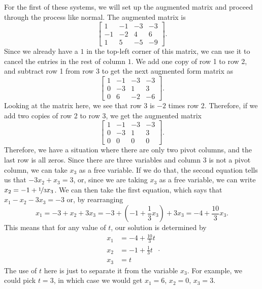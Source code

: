 \begin{exampleSol}
For the first of these systems, we will set up the augmented matrix and proceed through the process like normal. The augmented matrix is
\begin{equation*}
\left[ 
\begin{array}{ccc|c}
1 & -1 & -3 & -3 \\
-1 & -2 & 4 & 6 \\
1 & 5 & -5 & -9
\end{array}
\right].
\end{equation*}
Since we already have a $1$ in the top-left corner of this matrix, we can use it to cancel the entries in the rest of column $1$.  We add one copy of row 1 to row 2, and subtract row 1 from row 3 to get the next augmented form matrix as
\begin{equation*}
\left[ 
\begin{array}{ccc|c}
1 & -1 & -3 & -3 \\
0 & -3 & 1 & 3 \\
0 & 6 & -2 & -6
\end{array}
\right].
\end{equation*}
Looking at the matrix here, we see that row 3 is $-2$ times row 2. Therefore, if we add two copies of row 2 to row 3, we get the augmented matrix
\begin{equation*}
\left[ 
\begin{array}{ccc|c}
1 & -1 & -3 & -3 \\
0 & -3 & 1 & 3 \\
0 & 0 & 0 & 0
\end{array}
\right].
\end{equation*}
Therefore, we have a situation where there are only two pivot columns, and the last row is all zeros. Since there are three variables and column 3 is not a pivot column, we can take $x_3$ as a free variable. If we do that, the second equation tells us that $-3x_2 + x_3 = 3$, or, since we are taking $x_3$ as a free variable, we can write $x_2 = -1 + \nicefrac{1}{3}x_3$. We can then take the first equation, which says that $x_1 - x_2 - 3x_3 = -3$ or, by rearranging
\begin{equation*}
x_1 = -3 + x_2 + 3x_3 = -3 + \left(-1 + \frac{1}{3}x_3\right) + 3x_3 = -4 + \frac{10}{3}x_3.
\end{equation*}
This means that for any value of $t$, our solution is determined by
\begin{equation*}
\begin{split}
x_1 &=  -4 + \frac{10}{3}t \\
x_2 &= -1 + \frac{1}{3}t  \\
x_3 &= t
\end{split}.
\end{equation*}
The use of $t$ here is just to separate it from the variable $x_3$. For example, we could pick $t=3$, in which case we would get $x_1 = 6$, $x_2 = 0$, $x_3 = 3$. 


\end{exampleSol}
